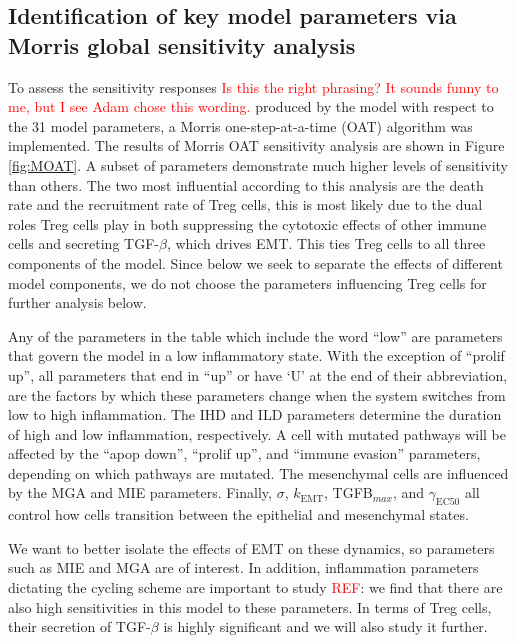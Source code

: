 \documentclass[11pt, preprint]{article}
\newcommand{\tcr} { \textcolor{red} }
\begin{document}
\subsection{Identification of key model parameters via Morris global sensitivity analysis}\label{SensAnalysis}
To assess the sensitivity responses \tcr{Is this the right phrasing? It sounds funny to me, but I see Adam chose this wording.} produced by the model with respect to the 31 model parameters, a Morris one-step-at-a-time (OAT) algorithm was implemented.
The results of Morris OAT sensitivity analysis are shown in Figure \ref{fig:MOAT}. A subset of parameters demonstrate much higher levels of sensitivity than others.
The two most influential according to this analysis are the death rate and the recruitment rate of Treg cells, this is most likely due to the dual roles Treg cells play in both suppressing the cytotoxic effects of other immune cells and secreting TGF-$\beta$, which drives EMT.
This ties Treg cells to all three components of the model.
Since below we seek to separate the effects of different model components, we do not choose the parameters influencing Treg cells for further analysis below.

Any of the parameters in the table which include the word ``low'' are parameters that govern the model in a low inflammatory state.
With the exception of ``prolif up'', all parameters that end in ``up'' or have `U' at the end of their abbreviation, are the factors by which these parameters change when the system switches from low to high inflammation.
The IHD and ILD parameters determine the duration of high and low inflammation, respectively.
A cell with mutated pathways will be affected by the ``apop down'', ``prolif up'', and ``immune evasion'' parameters, depending on which pathways are mutated.
The mesenchymal cells are influenced by the MGA and MIE parameters.
Finally, $\sigma$, $k_\text{EMT}$, TGFB$_{max}$, and $\gamma_\text{EC50}$ all control how cells transition between the epithelial and mesenchymal states.

We want to better isolate the effects of EMT on these dynamics, so parameters such as MIE and MGA are of interest.
In addition, inflammation parameters dictating the cycling scheme are important to study\tcr{REF}: we find that there are also high sensitivities in this model to these parameters.
In terms of Treg cells, their secretion of TGF-$\beta$ is highly significant and we will also study it further.
\end{document}
